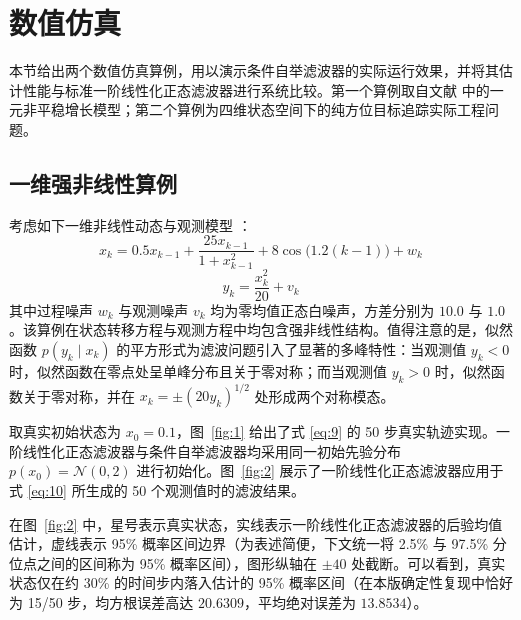 \section{数值仿真}\label{sec:sim}

本节给出两个数值仿真算例，用以演示条件自举滤波器的实际运行效果，并将其估计性能与标准一阶线性化正态滤波器进行系统比较。第一个算例取自文献 \cite{r08,r10} 中的一元非平稳增长模型；第二个算例为四维状态空间下的纯方位目标追踪实际工程问题。

\subsection{一维强非线性算例}\label{sec:sim-1d}

考虑如下一维非线性动态与观测模型 \cite{r08}：
\begin{equation}\label{eq:9}
x_k = 0.5 x_{k-1} + \frac{25 x_{k-1}}{1 + x_{k-1}^2} + 8 \cos\bigl(1.2(k - 1)\bigr) + w_k
\end{equation}
\begin{equation}\label{eq:10}
y_k = \frac{x_k^2}{20} + v_k
\end{equation}
其中过程噪声 $w_k$ 与观测噪声 $v_k$ 均为零均值正态白噪声，方差分别为 $10.0$ 与 $1.0$。该算例在状态转移方程与观测方程中均包含强非线性结构。值得注意的是，似然函数 $p(y_k \mid x_k)$ 的平方形式为滤波问题引入了显著的多峰特性：当观测值 $y_k < 0$ 时，似然函数在零点处呈单峰分布且关于零对称；而当观测值 $y_k > 0$ 时，似然函数关于零对称，并在 $x_k = \pm(20 y_k)^{1/2}$ 处形成两个对称模态。

取真实初始状态为 $x_0 = 0.1$，图~\ref{fig:1} 给出了式 \eqref{eq:9} 的 50 步真实轨迹实现。一阶线性化正态滤波器与条件自举滤波器均采用同一初始先验分布 $p(x_0) = \mathcal{N}(0, 2)$ 进行初始化。图~\ref{fig:2} 展示了一阶线性化正态滤波器应用于式 \eqref{eq:10} 所生成的 50 个观测值时的滤波结果。


在图~\ref{fig:2} 中，星号表示真实状态，实线表示一阶线性化正态滤波器的后验均值估计，虚线表示 95\% 概率区间边界（为表述简便，下文统一将 2.5\% 与 97.5\% 分位点之间的区间称为 95\% 概率区间），图形纵轴在 $\pm 40$ 处截断。可以看到，真实状态仅在约 30\% 的时间步内落入估计的 95\% 概率区间（在本版确定性复现中恰好为 15/50 步，均方根误差高达 $20.6309$，平均绝对误差为 $13.8534$）。


